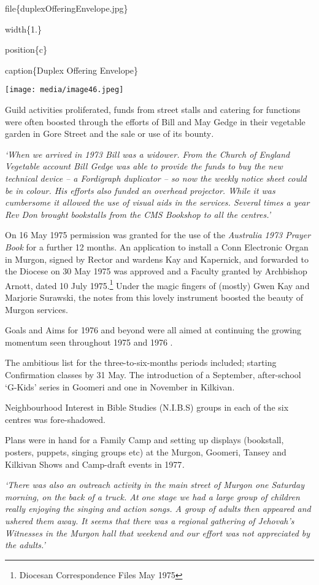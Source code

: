 file\{duplexOfferingEnvelope.jpg\}

width\{1.\}

position\{c\}

caption\{Duplex Offering Envelope\}

\texttt{[image: media/image46.jpeg]}

Guild activities proliferated, funds from street stalls and catering for functions were often boosted through the efforts of Bill and May Gedge in their vegetable garden in Gore Street and the sale or use of its bounty\emph{.}

\emph{`When we arrived in 1973 Bill was a widower. From the Church of England Vegetable account Bill Gedge was able to provide the funds to buy the new technical device -- a Fordigraph duplicator -- so now the weekly notice sheet could be in colour. His efforts also funded an overhead projector. While it was cumbersome it allowed the use of visual aids in the services. Several times a year Rev Don brought bookstalls from the CMS Bookshop to all the centres.'}

On 16 May 1975 permission was granted for the use of the \emph{Australia 1973 Prayer Book} for a further 12 months. An application to install a Conn Electronic Organ in Murgon, signed by Rector and wardens Kay and Kapernick, and forwarded to the Diocese on 30 May 1975 was approved and a Faculty granted by Archbishop Arnott, dated 10 July 1975.\footnote{Diocesan Correspondence Files May 1975} Under the magic fingers of (mostly) Gwen Kay and Marjorie Surawski, the notes from this lovely instrument boosted the beauty of Murgon services.

Goals and Aims for 1976 and beyond were all aimed at continuing the growing momentum seen throughout 1975 and 1976 .

The ambitious list for the three-to-six-months periods included; starting Confirmation classes by 31 May. The introduction of a September, after-school `G-Kids' series in Goomeri and one in November in Kilkivan.

Neighbourhood Interest in Bible Studies (N.I.B.S) groups in each of the six centres was fore-shadowed.

Plans were in hand for a Family Camp and setting up displays (bookstall, posters, puppets, singing groups etc) at the Murgon, Goomeri, Tansey and Kilkivan Shows and Camp-draft events in 1977\emph{.}

\emph{`There was also an outreach activity in the main street of Murgon one Saturday morning, on the back of a truck. At one stage we had a large group of children really enjoying the singing and action songs. A group of adults then appeared and ushered them away. It seems that there was a regional gathering of Jehovah's Witnesses in the Murgon hall that weekend and our effort was not appreciated by the adults.'}

